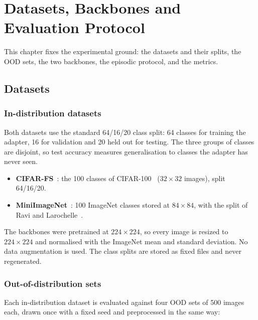 \chapter{Datasets, Backbones and Evaluation Protocol}
\label{ch:data}

This chapter fixes the experimental ground: the datasets and their splits, the OOD sets, the two
backbones, the episodic protocol, and the metrics.

\section{Datasets}
\label{sec:datasets}

\subsection{In-distribution datasets}

Both datasets use the standard 64/16/20 class split: 64 classes for training the adapter, 16 for
validation and 20 held out for testing. The three groups of classes are disjoint, so test accuracy
measures generalisation to classes the adapter has never seen.

\begin{itemize}
\item \textbf{CIFAR-FS}~\cite{bertinetto2019r2d2}: the 100 classes of CIFAR-100~\cite{krizhevsky2009cifar}
($32 \times 32$ images), split 64/16/20.
\item \textbf{MiniImageNet}~\cite{vinyals2016matching}: 100 ImageNet classes stored at $84 \times 84$,
with the split of Ravi and Larochelle~\cite{ravi2017optimization}.
\end{itemize}

The backbones were pretrained at $224 \times 224$, so every image is resized to $224 \times 224$ and
normalised with the ImageNet mean and standard deviation. No data augmentation is used. The class splits
are stored as fixed files and never regenerated.

\subsection{Out-of-distribution sets}

Each in-distribution dataset is evaluated against four OOD sets of 500 images each, drawn once with a
fixed seed and preprocessed in the same way:

